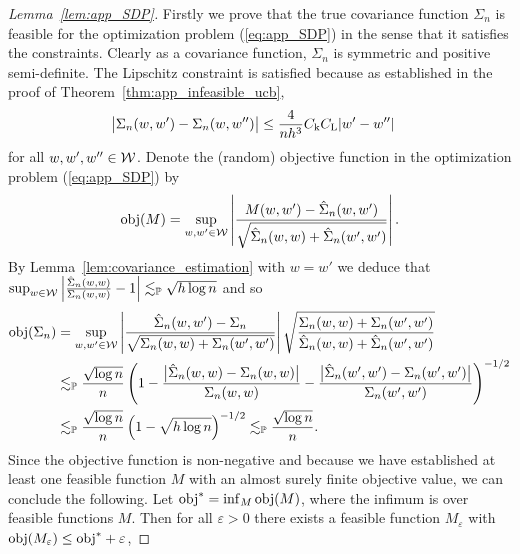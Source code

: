 \begin{proof}[Lemma~\ref{lem:app_SDP}]

  Firstly we prove that the true covariance function
  $\Sigma_n$
  is feasible for the optimization problem
  (\ref{eq:app_SDP}) in the sense that it satisfies the constraints.
  Clearly as a covariance function,
  $\Sigma_n$ is symmetric and positive semi-definite.
  The Lipschitz constraint is satisfied because
  as established in
  the proof of
  Theorem~\ref{thm:app_infeasible_ucb},
  \begin{align*}
    \big|
    \Sigma_n(w,w')
    -
    \Sigma_n(w, w'')
    \big|
    &\leq
    \frac{4}{nh^3}
    C_\mathrm{k}
    C_\mathrm{L}
    |w'-w''|
  \end{align*}
  for all $w,w',w'' \in \mathcal{W}$.
  Denote the (random) objective function
  in the optimization problem (\ref{eq:app_SDP}) by
  \begin{align*}
    \mathrm{obj}(M) = \sup_{w,w' \in \mathcal{W}}
    \left|
    \frac{M(w,w') - \hat\Sigma_n(w,w')}
    {\sqrt{\hat \Sigma_n(w,w) + \hat \Sigma_n(w',w')}}
    \right|.
  \end{align*}
  By Lemma~\ref{lem:covariance_estimation}
  with $w = w'$ we deduce that
  $\sup_{w \in \mathcal{W}}
  \left|\frac{\hat \Sigma_n(w,w)}{\Sigma_n(w,w)} - 1\right|
  \lesssim_{\mathbb{P}} \sqrt{h \log n}$
  and so
  \begin{align*}
    \mathrm{obj}(\Sigma_n)
    &= \sup_{w,w' \in \mathcal{W}}
    \left|
    \frac{\hat\Sigma_n(w,w') - \Sigma_n}
    {\sqrt{\Sigma_n(w,w) + \Sigma_n(w',w')}}
    \right|
    \sqrt{\frac{\Sigma_n(w,w) + \Sigma_n(w',w')}
      {\hat \Sigma_n(w,w) + \hat \Sigma_n(w',w')}} \\
    &\lesssim_{\mathbb{P}}
    \frac{\sqrt{\log n}}{n}
    \left(
      1 - \frac{\big|\hat \Sigma_n(w,w) - \Sigma_n(w,w)\big|}
      {\Sigma_n(w,w)}
      - \frac{\big|\hat \Sigma_n(w',w') - \Sigma_n(w',w')\big|}
      {\Sigma_n(w',w')}
    \right)^{-1/2} \\
    &\lesssim_{\mathbb{P}}
    \frac{\sqrt{\log n}}{n}
    \left(
      1 - \sqrt{h \log n}
    \right)^{-1/2}
    \lesssim_{\mathbb{P}}
    \frac{\sqrt{\log n}}{n}.
  \end{align*}
  Since the objective function
  is non-negative and because we have established
  at least one feasible function $M$ with
  an almost surely finite objective value,
  we can conclude the following.
  Let $\mathrm{obj}^* = \inf_M \mathrm{obj}(M)$,
  where the infimum is over feasible functions $M$.
  Then for all $\varepsilon > 0$
  there exists a feasible function $M_\varepsilon$ with
  $\mathrm{obj}(M_\varepsilon) \leq \mathrm{obj}^* + \varepsilon$,

\end{proof}
